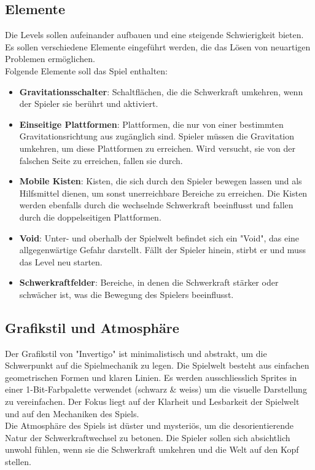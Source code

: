 \documentclass{article}
\begin{document}
\subsection{Elemente}

Die Levels sollen aufeinander aufbauen und eine steigende Schwierigkeit bieten.
Es sollen verschiedene Elemente eingeführt werden, die das Lösen von neuartigen Problemen ermöglichen.
\\
Folgende Elemente soll das Spiel enthalten:
\begin{itemize}
    \item \textbf{Gravitationsschalter}: Schaltflächen, die die Schwerkraft umkehren, wenn der Spieler sie berührt und aktiviert.
    \item \textbf{Einseitige Plattformen}: Plattformen, die nur von einer bestimmten Gravitationsrichtung aus zugänglich sind.
    Spieler müssen die Gravitation umkehren, um diese Plattformen zu erreichen. Wird versucht, sie von der falschen Seite zu erreichen, fallen sie durch.
    \item \textbf{Mobile Kisten}: Kisten, die sich durch den Spieler bewegen lassen und als Hilfsmittel dienen, um sonst unerreichbare Bereiche zu erreichen.
    Die Kisten werden ebenfalls durch die wechselnde Schwerkraft beeinflusst und fallen durch die doppelseitigen Plattformen.
    \item \textbf{Void}: Unter- und oberhalb der Spielwelt befindet sich ein "Void", das eine allgegenwärtige Gefahr darstellt. Fällt der Spieler hinein, stirbt er und muss das Level neu starten.
    \item \textbf{Schwerkraftfelder}: Bereiche, in denen die Schwerkraft stärker oder schwächer ist, was die Bewegung des Spielers beeinflusst.
\end{itemize}

\subsection{Grafikstil und Atmosphäre}

Der Grafikstil von "Invertigo" ist minimalistisch und abstrakt, um die Schwerpunkt auf die Spielmechanik zu legen. Die Spielwelt besteht aus einfachen geometrischen Formen und klaren Linien.
Es werden ausschliesslich Sprites in einer 1-Bit-Farbpalette verwendet (schwarz \& weiss) um die visuelle Darstellung zu vereinfachen.
Der Fokus liegt auf der Klarheit und Lesbarkeit der Spielwelt und auf den Mechaniken des Spiels.
\\
Die Atmosphäre des Spiels ist düster und mysteriös, um die desorientierende Natur der Schwerkraftwechsel zu betonen.
Die Spieler sollen sich absichtlich unwohl fühlen, wenn sie die Schwerkraft umkehren und die Welt auf den Kopf stellen.
\end{document}
